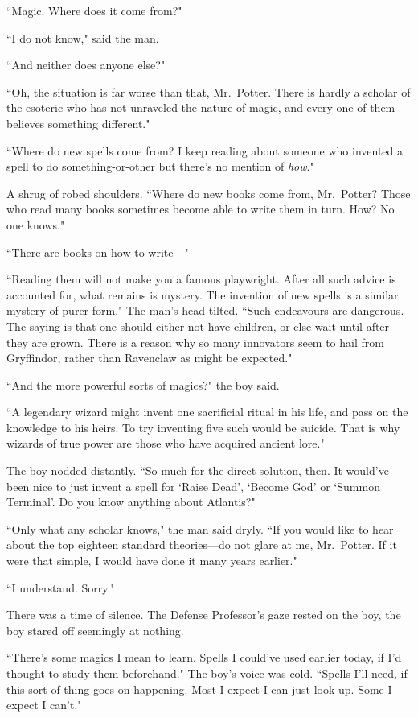 ``Magic. Where does it come from?"

``I do not know," said the man.

``And neither does anyone else?"

``Oh, the situation is far worse than that, Mr.~Potter. There is hardly a scholar of the esoteric who has not unraveled the nature of magic, and every one of them believes something different."

``Where do new spells come from? I keep reading about someone who invented a spell to do something-or-other but there's no mention of \emph{how}."

A shrug of robed shoulders. ``Where do new books come from, Mr.~Potter? Those who read many books sometimes become able to write them in turn. How? No one knows."

``There are books on how to write---"

``Reading them will not make you a famous playwright. After all such advice is accounted for, what remains is mystery. The invention of new spells is a similar mystery of purer form." The man's head tilted. ``Such endeavours are dangerous. The saying is that one should either not have children, or else wait until after they are grown. There is a reason why so many innovators seem to hail from Gryffindor, rather than Ravenclaw as might be expected."

``And the more powerful sorts of magics?" the boy said.

``A legendary wizard might invent one sacrificial ritual in his life, and pass on the knowledge to his heirs. To try inventing five such would be suicide. That is why wizards of true power are those who have acquired ancient lore."

The boy nodded distantly. ``So much for the direct solution, then. It would've been nice to just invent a spell for `Raise Dead', `Become God' or `Summon Terminal'. Do you know anything about Atlantis?"

``Only what any scholar knows," the man said dryly. ``If you would like to hear about the top eighteen standard theories---do not glare at me, Mr.~Potter. If it were that simple, I would have done it many years earlier."

``I understand. Sorry."

There was a time of silence. The Defense Professor's gaze rested on the boy, the boy stared off seemingly at nothing.

``There's some magics I mean to learn. Spells I could've used earlier today, if I'd thought to study them beforehand." The boy's voice was cold. ``Spells I'll need, if this sort of thing goes on happening. Most I expect I can just look up. Some I expect I can't."

